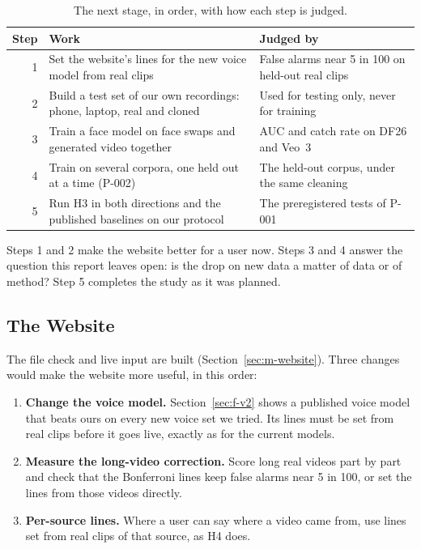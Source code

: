 \begin{table}[ht]
    \centering
    \small
    \caption{The next stage, in order, with how each step is judged.}
    \label{tab:nextsteps}
    \begin{tabularx}{\textwidth}{@{}r >{\raggedright\arraybackslash}p{5.2cm} >{\raggedright\arraybackslash}X@{}}
        \toprule
        \textbf{Step} & \textbf{Work} & \textbf{Judged by} \\
        \midrule
        1 & Set the website's lines for the new voice model from real clips & False alarms near 5 in 100 on held-out real clips \\
        2 & Build a test set of our own recordings: phone, laptop, real and cloned & Used for testing only, never for training \\
        3 & Train a face model on face swaps and generated video together & AUC and catch rate on DF26 and Veo~3 \\
        4 & Train on several corpora, one held out at a time (P-002) & The held-out corpus, under the same cleaning \\
        5 & Run H3 in both directions and the published baselines on our protocol & The preregistered tests of P-001 \\
        \bottomrule
    \end{tabularx}
\end{table}

Steps 1 and 2 make the website better for a user now. Steps 3 and 4 answer
the question this report leaves open: is the drop on new data a matter of
data or of method? Step 5 completes the study as it was planned.

\subsection{The Website}

The file check and live input are built (Section~\ref{sec:m-website}).
Three changes would make the website more useful, in this order:

\begin{enumerate}
    \item \textbf{Change the voice model.} Section~\ref{sec:f-v2} shows a
    published voice model that beats ours on every new voice set we tried. Its
    lines must be set from real clips before it goes live, exactly as for the
    current models.
    \item \textbf{Measure the long-video correction.} Score long real videos
    part by part and check that the Bonferroni lines keep false alarms near 5
    in 100, or set the lines from those videos directly.
    \item \textbf{Per-source lines.} Where a user can say where a video came
    from, use lines set from real clips of that source, as H4 does.
\end{enumerate}




